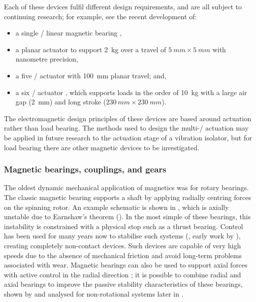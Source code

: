 \documentclass[11pt,a4paper]{memoir}
\begin{document}
Each of these devices fulfil different design requirements, and are all subject to continuing research; for example, see the recent development of:
\begin{itemize}
\item a single \dof/ linear magnetic bearing \cite{ro2009-preeng},
\item a planar actuator \cite{kim2007} to support \SI{2}{kg} over a travel of $\SI{5}{mm}\times\SI{5}{mm}$ with nanometre precision,
\item a five \dof/ actuator \cite{fulford2009} with \SI{100}{mm} planar travel; and,
\item a six \dof/ actuator \cite{jansen2008}, which supports loads in the order of \SI{10}{kg} with a large air gap (\SI{2}{mm}) and long stroke ($\SI{230}{mm}\times\SI{230}{mm}$).
\end{itemize}
The electromagnetic design principles of these devices are based around actuation rather than load bearing.
The methods used to design the multi-\dof/ actuation may be applied in future research to the actuation stage of a vibration isolator, but
for load bearing there are other magnetic devices to be investigated.


\subsubsection{Magnetic bearings, couplings, and gears}

The oldest dynamic mechanical application of magnetics was for rotary
bearings.
The classic magnetic bearing supports a shaft by applying radially centring forces on the spinning rotor.
An example schematic is shown in , which is axially unstable due to Earnshaw's theorem ().
In the most simple of these bearings, this instability is constrained with a physical stop such as a thrust bearing.
Control has been used for many years now to stabilise such systems (\eg, early work by \textcite{shimizu1968}), creating completely non-contact devices.
Such devices are capable of very high speeds due to the absence of mechanical friction and avoid long-term problems associated with wear.
Magnetic bearings can also be used to support axial forces with active control in the radial direction \cite{asami2005}; it is possible to combine radial and axial bearings to improve the passive stability characteristics of these bearings, shown by \textcite{delamare1994-ietm} and analysed for non-rotational systems later in .
\end{document}

